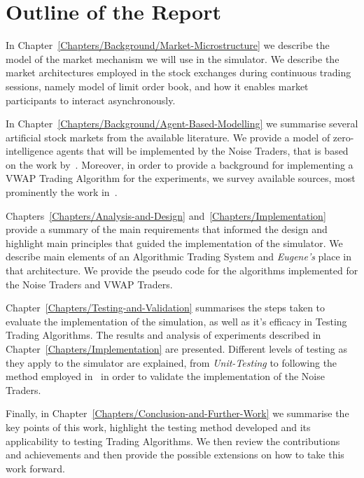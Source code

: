 \section{Outline of the Report \label{Chapters/Introduction/Outline}}

In Chapter~\ref{Chapters/Background/Market-Microstructure} we describe the model of the market mechanism we will use in the simulator. We describe the market architectures employed in the stock exchanges during continuous trading sessions, namely model of limit order book, and how it enables market participants to interact asynchronously.

In Chapter~\ref{Chapters/Background/Agent-Based-Modelling} we summarise several artificial stock markets from the available literature. We provide a model of zero-intelligence agents that will be implemented by the Noise Traders, that is based on the work by~\citet[chap.~4]{Gilles2006}. Moreover, in order to provide a background for implementing a VWAP Trading Algorithm for the experiments, we survey available sources, most prominently the work in~\cite{Coggins2006, Kakade2004}. 

Chapters~\ref{Chapters/Analysis-and-Design} and~\ref{Chapters/Implementation} provide a summary of the main requirements that informed the design and highlight main principles that guided the implementation of the simulator. We describe main elements of an Algorithmic Trading System and \textit{Eugene's} place in that architecture. We provide the pseudo code for the algorithms implemented for the Noise Traders and VWAP Traders.

Chapter~\ref{Chapters/Testing-and-Validation} summarises the steps taken to evaluate the implementation of the simulation, as well as it's efficacy in Testing Trading Algorithms. The results and analysis of experiments described in Chapter~\ref{Chapters/Implementation} are presented. Different levels of testing as they apply to the simulator are explained, from \textit{Unit-Testing} to following the method employed in~\cite[chap.~4]{Gilles2006} in order to validate the implementation of the Noise Traders.

Finally, in Chapter~\ref{Chapters/Conclusion-and-Further-Work} we summarise the key points of this work, highlight the testing method developed and its applicability to testing Trading Algorithms. We then review the contributions and achievements and then provide the possible extensions on how to take this work forward.



